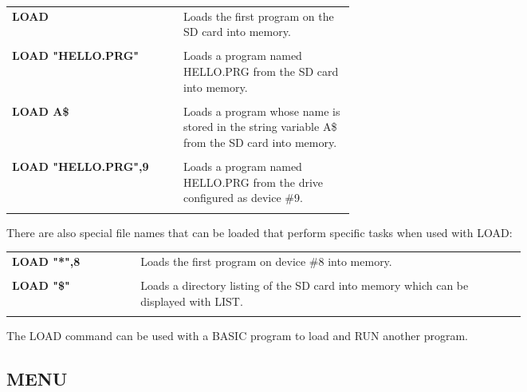 \begin{tabular}{l p{0.5\linewidth}}

	{\ttfamily\bfseries LOAD}&Loads the first program on the SD card into
	memory.\\\\

	{\ttfamily\bfseries LOAD "HELLO.PRG"}&Loads a program named {\ttfamily
	HELLO.PRG} from the SD card into memory.\\\\

	{\ttfamily\bfseries LOAD A\$}&Loads a program whose name is stored in the
	string variable {\ttfamily A\$} from the SD card into memory.\\\\

	{\ttfamily\bfseries LOAD "HELLO.PRG",9}&Loads a program named {\ttfamily
	HELLO.PRG} from the drive configured as device \#9.\\\\

\end{tabular}

\vspace{16pt}

There are also special file names that can be loaded that perform specific
tasks when used with {\ttfamily LOAD}:\\

\begin{tabular}{l p{0.75\linewidth}}

	{\ttfamily\bfseries LOAD "*",8}&Loads the first program on device \#8 into
	memory.\\\\

	{\ttfamily\bfseries LOAD "\$"}&Loads a directory listing of the SD card
	into memory which can be displayed with {\ttfamily LIST}.\\\\

\end{tabular}

\vspace{16pt}

The {\ttfamily LOAD} command can be used with a BASIC program to load and
{\ttfamily RUN} another program.\\

\subsection{MENU}

